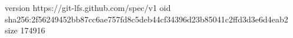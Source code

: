version https://git-lfs.github.com/spec/v1
oid sha256:2f56249452bb87cc6ae757fd8c5deb44cf34396d23b85041c2ffd3d3e6d4eab2
size 174916

